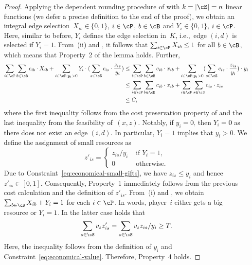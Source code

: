 \begin{proof}
Applying the dependent rounding procedure of 
with $k = |\cS| = n$ linear functions (we defer a precise definition to the end of the proof),
we obtain an integral edge selection~$X_{ib}\in\{0,1\}$, $i\in \cP$, $b\in \cB$ and $Y_i\in\{0,1\}$, $i\in \cP$.
Here, similar to before, $Y_i$ defines the edge selection in~$K$,
i.e.,~edge $(i, d)$ is selected if $Y_i = 1$.
From~(ii) and , it follows that
$\sum_{i\in \cP} X_{ib} \le 1$ for all $b\in \cB$,
which means that Property~2 of the lemma holds.
Further,
\begin{align*}
    \sum_{i\in\cP}\sum_{b\in\cB} c_{ib}\cdot X_{ib} +  \sum_{i\in\cP : y_i > 0} Y_i \cdot (\sum_{s\in\cS} c_{is}\cdot \frac{z_{is}}{y_i}) 
    &\le \sum_{i\in\cP}\sum_{b\in\cB} c_{ib}\cdot x_{ib} +  \sum_{i\in\cP : y_i > 0}(\sum_{s\in\cS} c_{is}\cdot \frac{z_{is}}{y_i}) \cdot y_i\\
    &\le \sum_{i\in\cP}\sum_{b\in\cB} c_{ib}\cdot x_{ib} +  \sum_{i\in\cP}\sum_{s\in\cS} c_{is}\cdot z_{is} \\
    &\leq C,
\end{align*}
where the first inequality follows from the cost preservation
property of  and the last inequality from the feasibility of~$(x,z)$. 
Notably, if $y_i = 0$, then $Y_i = 0$ as
there does not exist an edge $(i, d)$.
In particular, $Y_i = 1$ implies that $y_i > 0$.
We define the assignment of small resources as 
\begin{equation*}
z'_{is} = \begin{cases}
     z_{is}/y_i &\text{ if } Y_i = 1,\\
     0 &\text{ otherwise.}
\end{cases}
\end{equation*}
Due to Constraint~\eqref{eq:economical-small-gifts}, we have $z_{is} \le y_i$ and hence $z'_{is} \in [0, 1]$. Consequently, Property~1
immediately follows from the previous cost calculation and the definition of $z'_{is}$.
From~(i) and , we obtain $\sum_{b\in \cB} X_{ib} + Y_i = 1$ for each $i\in \cP$.
In words, player~$i$ either gets a big resource or $Y_i = 1$.
In the latter case holds that
\begin{equation*}
    \sum_{s\in \cS} v_s z'_{is} = 
    \sum_{s\in \cS} v_s z_{is} / y_i \ge T .
\end{equation*}
Here, the inequality follows from the definition of $y_i$ 
and Constraint~\eqref{eq:economical-value}.
Therefore, Property~4 holds.


\end{proof}
